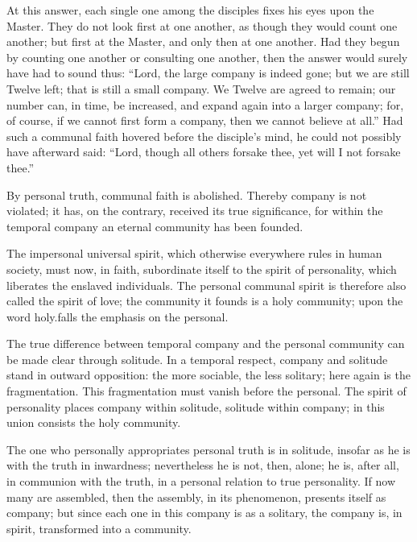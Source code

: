 \documentclass[12pt,a4paper]{book}
\begin{document}
At this answer, each single one among the disciples fixes his eyes upon the Master. They do not look first at one another, as though they would count one another; but first at the Master, and only then at one another. Had they begun by counting one another or consulting one another, then the answer would surely have had to sound thus: ``Lord, the large company is indeed gone; but we are still Twelve left; that is still a small company. We Twelve are agreed to remain; our number can, in time, be increased, and expand again into a larger company; for, of course, if we cannot first form a company, then we cannot believe at all.''
Had such a communal faith hovered before the disciple's mind, he could not possibly have afterward said: ``Lord, though all others forsake thee, yet will I not forsake thee.''

By personal truth, communal faith is abolished. Thereby company is not violated; it has, on the contrary, received its true significance, for within the temporal company an eternal community has been founded.

The impersonal universal spirit, which otherwise everywhere rules in human society, must now, in faith, subordinate itself to the spirit of personality, which liberates the enslaved individuals. The personal communal spirit is therefore also called the spirit of love; the community it founds is a holy community; upon the word holy.falls the emphasis on the personal.

The true difference between temporal company and the personal community can be made clear through solitude. In a temporal respect, company and solitude stand in outward opposition: the more sociable, the less solitary; here again is the fragmentation. This fragmentation must vanish before the personal. The spirit of personality places company within solitude, solitude within company; in this union consists the holy community.

The one who personally appropriates personal truth is in solitude, insofar as he is with the truth in inwardness; nevertheless he is not, then, alone; he is, after all, in communion with the truth, in a personal relation to true personality. If now many are assembled, then the assembly, in its phenomenon, presents itself as company; but since each one in this company is as a solitary, the company is, in spirit, transformed into a community.
\end{document}
